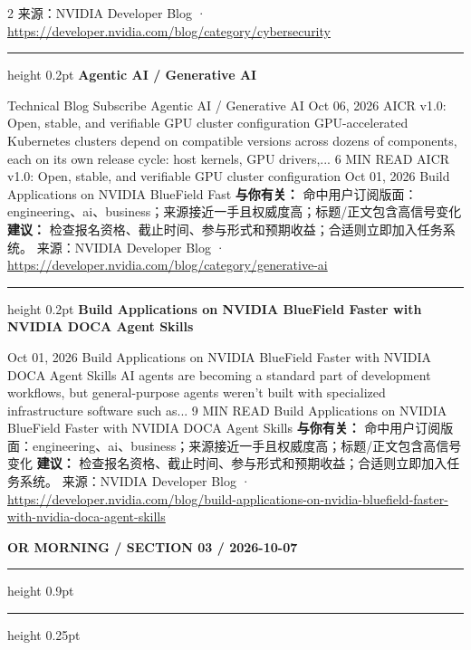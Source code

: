 \documentclass[10.5pt]{ctexart}
\begin{document}
\begin{multicols}{2}
{\footnotesize\color{ormuted} 来源：NVIDIA Developer Blog · \url{https://developer.nvidia.com/blog/category/cybersecurity}}
\vspace{2mm}
\hrule height 0.2pt
\vspace{2mm}
{\large\bfseries Agentic AI / Generative AI}\par
Technical Blog Subscribe Agentic AI / Generative AI Oct 06, 2026 AICR v1.0: Open, stable, and verifiable GPU cluster configuration GPU-accelerated Kubernetes clusters depend on compatible versions across dozens of components, each on its own release cycle: host kernels, GPU drivers,... 6 MIN READ AICR v1.0: Open, stable, and verifiable GPU cluster configuration Oct 01, 2026 Build Applications on NVIDIA BlueField Fast
\textbf{与你有关：} 命中用户订阅版面：engineering、ai、business；来源接近一手且权威度高；标题/正文包含高信号变化
\textbf{建议：} 检查报名资格、截止时间、参与形式和预期收益；合适则立即加入任务系统。
{\footnotesize\color{ormuted} 来源：NVIDIA Developer Blog · \url{https://developer.nvidia.com/blog/category/generative-ai}}
\vspace{2mm}
\hrule height 0.2pt
\vspace{2mm}
{\large\bfseries Build Applications on NVIDIA BlueField Faster with NVIDIA DOCA Agent Skills}\par
Oct 01, 2026 Build Applications on NVIDIA BlueField Faster with NVIDIA DOCA Agent Skills AI agents are becoming a standard part of development workflows, but general-purpose agents weren't built with specialized infrastructure software such as... 9 MIN READ Build Applications on NVIDIA BlueField Faster with NVIDIA DOCA Agent Skills
\textbf{与你有关：} 命中用户订阅版面：engineering、ai、business；来源接近一手且权威度高；标题/正文包含高信号变化
\textbf{建议：} 检查报名资格、截止时间、参与形式和预期收益；合适则立即加入任务系统。
{\footnotesize\color{ormuted} 来源：NVIDIA Developer Blog · \url{https://developer.nvidia.com/blog/build-applications-on-nvidia-bluefield-faster-with-nvidia-doca-agent-skills}}
\end{multicols}
\newpage
{\small\bfseries OR MORNING / SECTION 03 / 2026-10-07}
\vspace{2mm}
\hrule height 0.9pt
\vspace{1.5mm}
\hrule height 0.25pt
\vspace{4mm}
\end{document}
